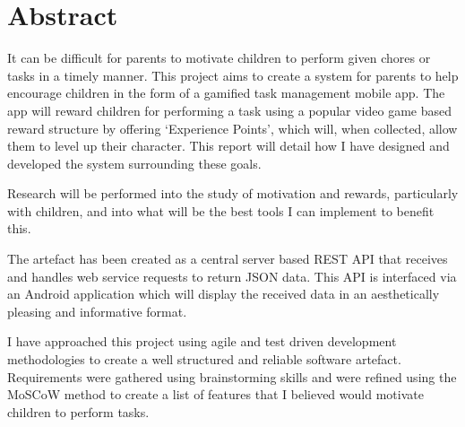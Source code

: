 \chapter*{Abstract}
It can be difficult for parents to motivate children to perform given chores or tasks in a timely manner.
This project aims to create a system for parents to help encourage children in the form of a gamified task management mobile app.
The app will reward children for performing a task using a popular video game based reward structure by offering `Experience Points', which will, when collected, allow them to level up their character.  
This report will detail how I have designed and developed the system surrounding these goals.

Research will be performed into the study of motivation and rewards, particularly with children, and into what will be the best tools I can implement to benefit this.

The artefact has been created as a central server based REST API that receives and handles web service requests to return JSON data.
This API is interfaced via an Android application which will display the received data in an aesthetically pleasing and informative format.

I have approached this project using agile and test driven development methodologies to create a well structured and reliable software artefact.
Requirements were gathered using brainstorming skills and were refined using the MoSCoW method to create a list of features that I believed would motivate children to perform tasks.